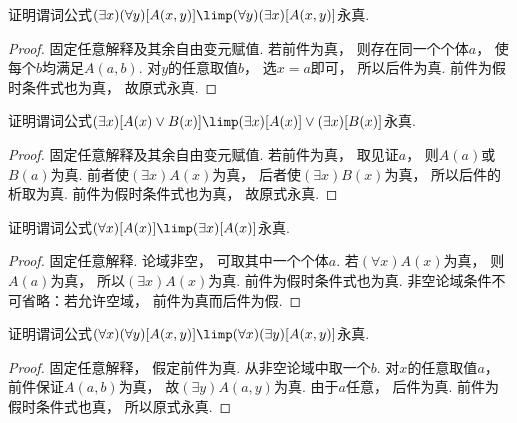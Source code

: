 \begin{example}
证明谓词公式\(
	(\exists x)
	(\forall y)
	[A(x,y)]
	\limp
	(\forall y)
	(\exists x)
	[A(x,y)]
\)永真.
    \begin{proof}
        固定任意解释及其余自由变元赋值.
        若前件为真，
        则存在同一个个体\(a\)，
        使每个\(b\)均满足\(A(a,b)\).
        对\(y\)的任意取值\(b\)，
        选\(x=a\)即可，
        所以后件为真.
        前件为假时条件式也为真，
        故原式永真.
    \end{proof}
\end{example}

\begin{example}
证明谓词公式\(
	(\exists x)
	[
		A(x) \lor B(x)
	]
	\limp
	(\exists x)
	[A(x)]
	\lor
	(\exists x)
	[B(x)]
\)永真.
    \begin{proof}
        固定任意解释及其余自由变元赋值.
        若前件为真，
        取见证\(a\)，
        则\(A(a)\)或\(B(a)\)为真.
        前者使\((\exists x)A(x)\)为真，
        后者使\((\exists x)B(x)\)为真，
        所以后件的析取为真.
        前件为假时条件式也为真，
        故原式永真.
    \end{proof}
\end{example}

\begin{example}
证明谓词公式\(
	(\forall x)
	[A(x)]
	\limp
	(\exists x)
	[A(x)]
\)永真.
    \begin{proof}
        固定任意解释.
        论域非空，
        可取其中一个个体\(a\).
        若\((\forall x)A(x)\)为真，
        则\(A(a)\)为真，
        所以\((\exists x)A(x)\)为真.
        前件为假时条件式也为真.
        非空论域条件不可省略：若允许空域，
        前件为真而后件为假.
    \end{proof}
\end{example}

\begin{example}
证明谓词公式\(
	(\forall x)
	(\forall y)
	[A(x,y)]
	\limp
	(\forall x)
	(\exists y)
	[A(x,y)]
\)永真.
    \begin{proof}
        固定任意解释，
        假定前件为真.
        从非空论域中取一个\(b\).
        对\(x\)的任意取值\(a\)，
        前件保证\(A(a,b)\)为真，
        故\((\exists y)A(a,y)\)为真.
        由于\(a\)任意，
        后件为真.
        前件为假时条件式也真，
        所以原式永真.
    \end{proof}
\end{example}

